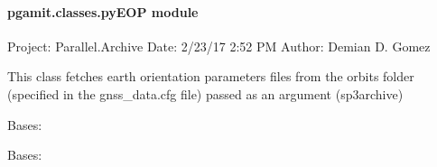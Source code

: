 \documentclass[letterpaper,10pt,english]{sphinxmanual}
\begin{document}
\paragraph{pgamit.classes.pyEOP module}
\label{\detokenize{pgamit.classes:module-pgamit.classes.pyEOP}}\label{\detokenize{pgamit.classes:pgamit-classes-pyeop-module}}
\sphinxAtStartPar
Project: Parallel.Archive
Date: 2/23/17 2:52 PM
Author: Demian D. Gomez

\sphinxAtStartPar
This class fetches earth orientation parameters files from the orbits folder (specified in the gnss\_data.cfg file) passed as an argument (sp3archive)

\begin{fulllineitems}
\label{\detokenize{pgamit.classes:pgamit.classes.pyEOP.GetEOP}}
\pysigstartsignatures
\pysiglinewithargsret
{}
{\sphinxparamcomma {}\sphinxparamcomma {}\sphinxparamcomma {}}
{}
\pysigstopsignatures
\sphinxAtStartPar
Bases: {\hyperref[\detokenize{pgamit.classes:pgamit.classes.pyProducts.OrbitalProduct}]{}}

\end{fulllineitems}


\begin{fulllineitems}
\label{\detokenize{pgamit.classes:pgamit.classes.pyEOP.pyEOPException}}
\pysigstartsignatures
\pysiglinewithargsret
{}
{}
{}
\pysigstopsignatures
\sphinxAtStartPar
Bases: {\hyperref[\detokenize{pgamit.classes:pgamit.classes.pyProducts.pyProductsException}]{}}

\end{fulllineitems}
\end{document}
